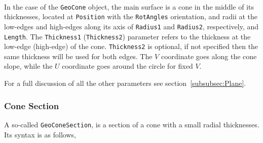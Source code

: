 ~\\
In the case of the {\tt GeoCone} object, the main surface is a cone in the middle of its thicknesses, located at {\tt Position} with the {\tt RotAngles}
orientation, and radii at the low-edges and high-edges along its axis of {\tt Radius1} and {\tt Radius2}, respectively, and {\tt Length}. The 
{\tt Thickness1} ({\tt Thickness2}) parameter refers to the thickness at the low-edge (high-edge) of the cone. {\tt Thickness2} is optional, if not 
specified then the same thickness will be used for both edges. The $V$ coordinate goes along the cone slope, while the $U$ coordinate goes around the 
circle for fixed $V$.

For a full discussion of all the other parameters see section~\ref{subsubsec:Plane}.

\subsubsection{Cone Section}

A so-called {\tt GeoConeSection}, is a section of a cone with a small radial thicknesses. Its syntax is as follows,

